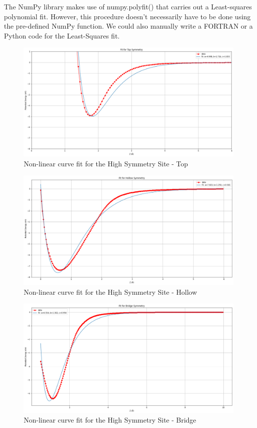 \documentclass[12pt]{article}
\begin{document}
The NumPy library makes use of numpy.polyfit() that carries out a Least-squares polynomial fit. However, this procedure doesn't necessarily have to be done using the pre-defined NumPy function. We could also manually write a FORTRAN or a Python code for the Least-Squares fit.

\begin{figure}[h!]
    \centering
    \includegraphics[scale = 0.28]{top.png}
    \caption{Non-linear curve fit for the High Symmetry Site - Top} 
    \label{fig:23}
\end{figure}  

\begin{figure}[h!]
    \centering
    \includegraphics[scale = 0.28]{hollow.png}
    \caption{Non-linear curve fit for the High Symmetry Site - Hollow} 
    \label{fig:24}
\end{figure}  

\begin{figure}[h!]
    \centering
    \includegraphics[scale = 0.28]{bridge.png}
      \caption{Non-linear curve fit for the High Symmetry Site - Bridge} 
    \label{fig:25}
\end{figure}  
\pagebreak
\end{document}
